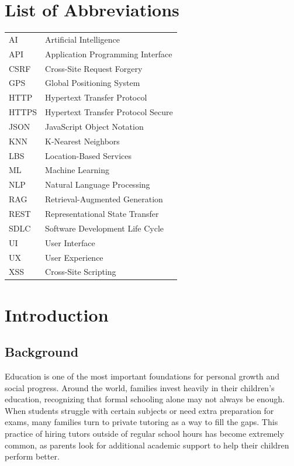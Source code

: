 \documentclass[12pt]{report}
\begin{document}
\hypersetup{pageanchor=false}

\tableofcontents
\listoffigures
\listoftables
\noindent\chapter*{List of Abbreviations}

\begin{tabular}{l l}
AI & Artificial Intelligence \\
API & Application Programming Interface \\
CSRF & Cross-Site Request Forgery \\
GPS & Global Positioning System \\
HTTP & Hypertext Transfer Protocol \\
HTTPS & Hypertext Transfer Protocol Secure \\
JSON & JavaScript Object Notation \\
KNN & K-Nearest Neighbors \\
LBS & Location-Based Services \\
ML & Machine Learning \\
NLP & Natural Language Processing \\
RAG & Retrieval-Augmented Generation \\
REST & Representational State Transfer \\
SDLC & Software Development Life Cycle \\
UI & User Interface \\
UX & User Experience \\
XSS & Cross-Site Scripting \\
\end{tabular}

\chapter{Introduction}

\section{Background}

Education is one of the most important foundations for personal growth and social progress. Around the world, families invest heavily in their children's education, recognizing that formal schooling alone may not always be enough. When students struggle with certain subjects or need extra preparation for exams, many families turn to private tutoring as a way to fill the gaps. This practice of hiring tutors outside of regular school hours has become extremely common, as parents look for additional academic support to help their children perform better.
\end{document}
